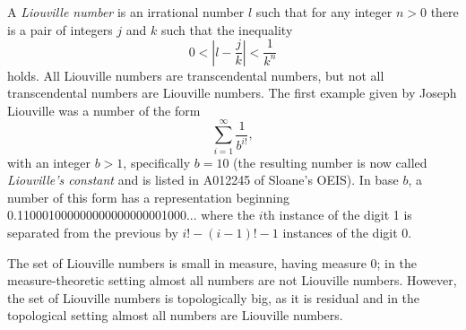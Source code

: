 \documentclass[12pt]{article}
\begin{document}
A {\em Liouville number} is an irrational number $l$ such that for any integer $n > 0$ there is a pair of integers $j$ and $k$ such that the inequality $$0 < |l - \frac{j}{k}| < \frac{1}{k^n}$$ holds. All Liouville numbers are transcendental numbers, but not all transcendental numbers are Liouville numbers. The first example given by Joseph Liouville was a number of the form $$\sum_{i = 1}^\infty \frac{1}{b^{i!}},$$ with an integer $b > 1$, specifically $b = 10$ (the resulting number is now called {\em Liouville's constant} and is listed in A012245 of Sloane's OEIS). In base $b$, a number of this form has a representation beginning 0.110001000000000000000001000... where the $i$th instance of the digit 1 is separated from the previous by $i! - (i - 1)! - 1$ instances of the digit 0.

The set of Liouville numbers is small in measure, having measure 0; in the measure-theoretic setting almost all numbers are not Liouville numbers. However, the set of Liouville numbers is topologically big, as it is residual and in the topological setting almost all numbers are Liouville numbers.
\end{document}
